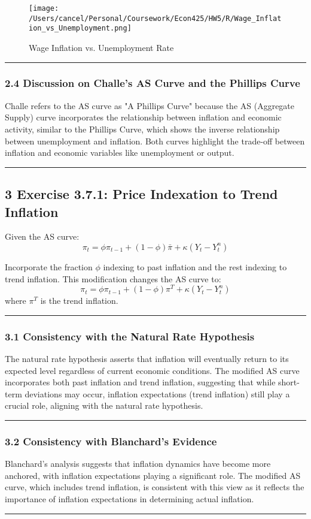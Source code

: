 \documentclass{article}
\begin{document}
\begin{figure}[H]
    \centering
    \texttt{[image: /Users/cancel/Personal/Coursework/Econ425/HW5/R/Wage\_Inflation\_vs\_Unemployment.png]}
    \caption{Wage Inflation vs. Unemployment Rate}
\end{figure}

\noindent\rule{\linewidth}{0.5pt}

\subsubsection*{2.4 Discussion on Challe's AS Curve and the Phillips Curve}

Challe refers to the AS curve as "A Phillips Curve" because the AS (Aggregate Supply) curve incorporates the relationship between inflation and economic activity, similar to the Phillips Curve, which shows the inverse relationship between unemployment and inflation. Both curves highlight the trade-off between inflation and economic variables like unemployment or output.

\noindent\rule{\linewidth}{1pt}

\subsection*{3 Exercise 3.7.1: Price Indexation to Trend Inflation}

Given the AS curve:
\[
\pi_t = \phi \pi_{t-1} + (1-\phi) \bar{\pi} + \kappa (Y_t - Y_t^n)
\]

Incorporate the fraction \( \phi \) indexing to past inflation and the rest indexing to trend inflation. This modification changes the AS curve to:
\[
\pi_t = \phi \pi_{t-1} + (1-\phi) \pi^T + \kappa (Y_t - Y_t^n)
\]
where \( \pi^T \) is the trend inflation.

\noindent\rule{\linewidth}{0.5pt}

\subsubsection*{3.1 Consistency with the Natural Rate Hypothesis}

The natural rate hypothesis asserts that inflation will eventually return to its expected level regardless of current economic conditions. The modified AS curve incorporates both past inflation and trend inflation, suggesting that while short-term deviations may occur, inflation expectations (trend inflation) still play a crucial role, aligning with the natural rate hypothesis.

\noindent\rule{\linewidth}{0.5pt}

\subsubsection*{3.2 Consistency with Blanchard's Evidence}

Blanchard's analysis suggests that inflation dynamics have become more anchored, with inflation expectations playing a significant role. The modified AS curve, which includes trend inflation, is consistent with this view as it reflects the importance of inflation expectations in determining actual inflation.

\noindent\rule{\linewidth}{1pt}
\end{document}
